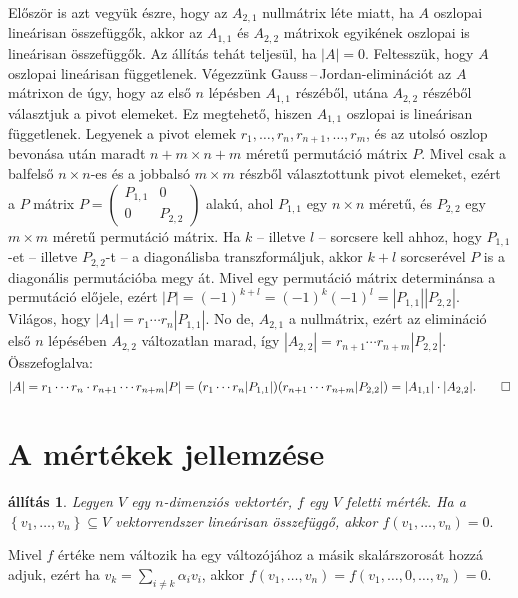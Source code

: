 \documentclass[a4paper, showtrims]{memoir}
\makeatletter
\renewenvironment{proof}[1][\proofname]
    {\par\pushQED{\qed}%
    \normalfont \topsep6\p@\@plus6\p@\relax
    \trivlist
    \item[\hskip\labelsep
        \itshape
    #1\@addpunct{:}]\ignorespaces}
    {\popQED\endtrivlist\@endpefalse}
\theoremstyle{plain}
\newtheorem{proposition}{állítás}[chapter]
\theoremstyle{remark}
\theoremstyle{definition}
\makeatother
\begin{document}
\begin{proof}[Gauss\,--\,Jordan-elimináció alapján]
	Először is azt vegyük észre, hogy az $A_{2,1}$ nullmátrix léte miatt,
	ha $A$ oszlopai lineárisan összefüggők,
	akkor az $A_{1,1}$ és $A_{2,2}$ mátrixok egyikének oszlopai is lineárisan összefüggők.
	Az állítás tehát teljesül, ha $|A|=0$.
	Feltesszük, hogy $A$ oszlopai lineárisan függetlenek.
	Végezzünk Gauss\,--\,Jordan-eliminációt az $A$ mátrixon de úgy,
	hogy az első $n$ lépésben $A_{1,1}$ részéből, utána $A_{2,2}$ részéből választjuk a pivot elemeket.
	Ez megtehető, hiszen $A_{1,1}$ oszlopai is lineárisan függetlenek.
	Legyenek a pivot elemek $r_1,\ldots,r_n,r_{n+1},\ldots,r_m$,
	és az utolsó oszlop bevonása után maradt $n+m\times n+m$ méretű permutáció mátrix $P$.
	Mivel csak a balfelső $n\times n$-es és a jobbalsó $m\times m$ részből választottunk pivot elemeket,
	ezért a $P$ mátrix
	\begin{math}
		P=
		\begin{pmatrix}
			P_{1,1} & 0       \\
			0       & P_{2,2}
		\end{pmatrix}
	\end{math}
	alakú, ahol $P_{1,1}$ egy $n\times n$ méretű,
	és $P_{2,2}$ egy $m\times m$ méretű permutáció mátrix.
	Ha $k$ -- illetve $l$ -- sorcsere kell ahhoz,
	hogy $P_{1,1}$-et -- illetve $P_{2,2}$-t -- a diagonálisba transzformáljuk,
	akkor $k+l$ sorcserével $P$ is a diagonális permutációba megy át.
	Mivel egy permutáció mátrix determinánsa a permutáció előjele, ezért
	\(
	|P|=(-1)^{k+l}=\left( -1 \right)^k\left( -1 \right)^l=|P_{1,1}||P_{2,2}|.
	\)
	Világos, hogy $|A_1|=r_1\cdots r_n|P_{1,1}|$.
	No de, $A_{2,1}$ a nullmátrix, ezért az elimináció első $n$ lépésében $A_{2,2}$ változatlan marad,
	így $|A_{2,2}|=r_{n+1}\cdots r_{n+m}|P_{2,2}|$.
	Összefoglalva:
	\[
		|A|
		=r_1\cdots r_n\cdot r_{n+1}\cdots r_{n+m}|P|
		=(r_1\cdots r_n|P_{1,1}|)(r_{n+1}\cdots r_{n+m}|P_{2,2}|)
		=|A_{1,1}|\cdot|A_{2,2}|.\qedhere
	\]
\end{proof}

\section{A mértékek jellemzése}

\begin{proposition}
	Legyen $V$ egy $n$-dimenziós vektortér, $f$ egy $V$ feletti mérték.
	Ha a $\left\{ v_{1},\ldots ,v_{n}\right\} \subseteq V$ vektorrendszer lineárisan összefüggő,
	akkor
	\(
	f\left( v_{1},\ldots ,v_{n}\right) =0.
	\)
\end{proposition}
\begin{proof}
	Mivel $f$ értéke nem változik ha egy változójához a másik skalárszorosát hozzá adjuk,
	ezért ha $v_{k}=\sum_{i\neq k}\alpha _{i}v_{i}$,
	akkor
	$f\left(v_{1},\ldots ,v_{n}\right)
		=
		f\left( v_{1},\ldots ,0,\ldots ,v_{n}\right)
		=
		0$.
\end{proof}
\end{document}
